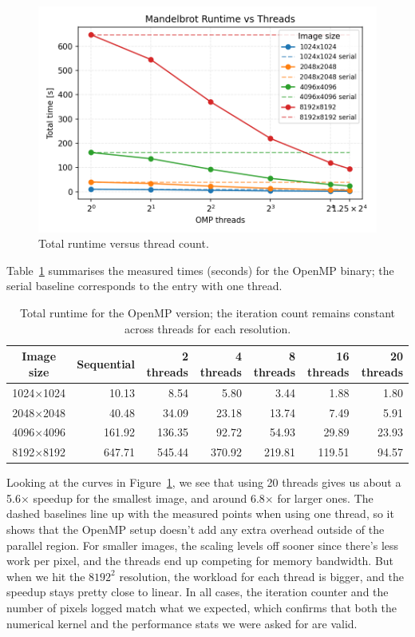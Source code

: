 \begin{figure}[H]
    \centering
    \includegraphics[width=0.75\linewidth]{../Skeleton_codes/mandel/plots/mandel_runtime_scaling.png}
    \caption{Total runtime versus thread count.}
    \label{fig:mandel_scaling}
\end{figure}

Table~\ref{tab:mandel_times} summarises the measured times (seconds) for the OpenMP binary; the serial baseline corresponds to the entry with one thread.
\begin{table}[H]
    \centering
    \begin{tabular}{c|rrrrrr}
        \hline
        Image size & Sequential & 2 threads & 4 threads & 8 threads & 16 threads & 20 threads \\
        \hline
        1024×1024 & 10.13 & 8.54 & 5.80 & 3.44 & 1.88 & 1.80 \\
        2048×2048 & 40.48 & 34.09 & 23.18 & 13.74 & 7.49 & 5.91 \\
        4096×4096 & 161.92 & 136.35 & 92.72 & 54.93 & 29.89 & 23.93 \\
        8192×8192 & 647.71 & 545.44 & 370.92 & 219.81 & 119.51 & 94.57 \\
        \hline
    \end{tabular}
    \caption{Total runtime for the OpenMP version; the iteration count remains constant across threads for each resolution.}
    \label{tab:mandel_times}
\end{table}

Looking at the curves in Figure~\ref{fig:mandel_scaling}, we see that using 20 threads gives us about a 5.6× speedup for the smallest image, and around 6.8× for larger ones. The dashed baselines line up with the measured points when using one thread, so it shows that the OpenMP setup doesn't add any extra overhead outside of the parallel region. For smaller images, the scaling levels off sooner since there’s less work per pixel, and the threads end up competing for memory bandwidth. But when we hit the $8192^2$ resolution, the workload for each thread is bigger, and the speedup stays pretty close to linear. In all cases, the iteration counter and the number of pixels logged match what we expected, which confirms that both the numerical kernel and the performance stats we were asked for are valid.